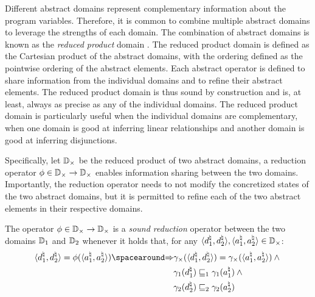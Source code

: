 Different abstract domains represent complementary information about the program variables. Therefore, it is common to combine multiple abstract domains to leverage the strengths of each domain. The combination of abstract domains is known as the \emph{reduced product} domain . The reduced product domain is defined as the Cartesian product of the abstract domains, with the ordering defined as the pointwise ordering of the abstract elements. Each abstract operator is defined to share information from the individual domains and to refine their abstract elements.
The reduced product domain is thus sound by construction and is, at least, always as precise as any of the individual domains. The reduced product domain is particularly useful when the individual domains are complementary, \eg{} when one domain is good at inferring linear relationships and another domain is good at inferring disjunctions.

Specifically, let $\mathbb{D}_{\times}$ be the reduced product of two abstract domains, a reduction operator $\phi\in\mathbb{D}_{\times}\to\mathbb{D}_{\times}$ enables information sharing between the two domains.
Importantly, the reduction operator needs to not modify the concretized states of the two abstract domains, but it is permitted to refine each of the two abstract elements in their respective domains.

\begin{definition}
  The operator $\phi\in\mathbb{D}_{\times}\to\mathbb{D}_{\times}$ is a \emph{sound reduction} operator between the two domains $\mathbb{D}_1$ and $\mathbb{D}_2$ whenever it holds that, for any $\langle d^\natural_1, d^\natural_2 \rangle, \langle a^\natural_1, a^\natural_2 \rangle \in \mathbb{D}_{\times}$:
  \begin{align*}
    \tuple{\defabstractvalue_1}{\defabstractvalue_2} = \productdomainreduce(\tuple{\defotherabstractvalue_1}{\defotherabstractvalue_2}) \ImplieS
    &\productdomainconcretization(\tuple{\defabstractvalue_1}{\defabstractvalue_2}) = \productdomainconcretization(\tuple{\defotherabstractvalue_1}{\defotherabstractvalue_2}) \land {} \\
    &\abstractdomainconcretization_1(\defabstractvalue_1) \abstractdomainsubseteq_1 \abstractdomainconcretization_1(\defotherabstractvalue_1) \land {} \\
    &\abstractdomainconcretization_2(\defabstractvalue_2) \abstractdomainsubseteq_2 \abstractdomainconcretization_2(\defotherabstractvalue_2)
  \end{align*}
\end{definition}

